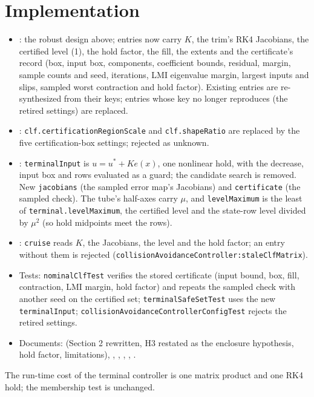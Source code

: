 \documentclass[11pt]{article}
\begin{document}
\section{Implementation}
\begin{itemize}
\item {}: the robust design above;
  entries now carry $K$, the trim's RK4 Jacobians, the certified level (1),
  the hold factor, the fill, the extents and the certificate's record
  (box, input box, components, coefficient bounds, residual, margin, sample
  counts and seed, iterations, LMI eigenvalue margin, largest inputs and
  slips, sampled worst contraction and hold factor). Existing entries are
  re-synthesized from their keys; entries whose key no longer reproduces
  (the retired settings) are replaced.
\item {}:
  \texttt{clf.certificationRegionScale} and \texttt{clf.shapeRatio} are
  replaced by the five certification-box settings; rejected as unknown.
\item {}: \texttt{terminalInput} is
  $u=u^*+Ke(x)$, one nonlinear hold, with the decrease, input box and rows
  evaluated as a guard; the candidate search is removed. New
  \texttt{jacobians} (the sampled error map's Jacobians) and
  \texttt{certificate} (the sampled check). The tube's half-axes carry
  $\mu$, and \texttt{levelMaximum} is the least of \texttt{terminal.levelMaximum},
  the certified level and the state-row level divided by $\mu^2$ (so hold
  midpoints meet the rows).
\item {}: \texttt{cruise} reads
  $K$, the Jacobians, the level and the hold factor; an entry without them
  is rejected (\texttt{collisionAvoidanceController:staleClfMatrix}).
\item Tests: \texttt{nominalClfTest} verifies the stored certificate
  (input bound, box, fill, contraction, LMI margin, hold factor) and repeats
  the sampled check with another seed on the certified set;
  \texttt{terminalSafeSetTest} uses the new \texttt{terminalInput};
  \texttt{collisionAvoidanceControllerConfigTest} rejects the retired
  settings.
\item Documents:  (Section 2 rewritten,
  H3 restated as the enclosure hypothesis, hold factor, limitations),
  , ,
  , , .
\end{itemize}
The run-time cost of the terminal controller is one matrix product and one
RK4 hold; the membership test is unchanged.
\end{document}
